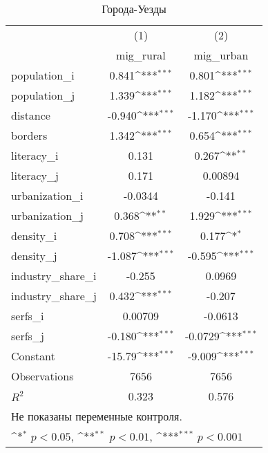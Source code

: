 \begin{table}[htbp]\centering
\def\sym#1{\ifmmode^{#1}\else\(^{#1}\)\fi}
\caption{Города-Уезды\label{table:r-u}}
\begin{tabular}{l*{2}{c}}
\hline\hline
                    &\multicolumn{1}{c}{(1)}&\multicolumn{1}{c}{(2)}\\
                    &\multicolumn{1}{c}{mig\_rural}&\multicolumn{1}{c}{mig\_urban}\\
\hline
population\_i        &       0.841\sym{***}&       0.801\sym{***}\\
population\_j        &       1.339\sym{***}&       1.182\sym{***}\\
distance            &      -0.940\sym{***}&      -1.170\sym{***}\\
borders             &       1.342\sym{***}&       0.654\sym{***}\\
literacy\_i          &       0.131         &       0.267\sym{**} \\
literacy\_j          &       0.171         &     0.00894         \\
urbanization\_i      &     -0.0344         &      -0.141         \\
urbanization\_j      &       0.368\sym{**} &       1.929\sym{***}\\
density\_i           &       0.708\sym{***}&       0.177\sym{*}  \\
density\_j           &      -1.087\sym{***}&      -0.595\sym{***}\\
industry\_share\_i    &      -0.255         &      0.0969         \\
industry\_share\_j    &       0.432\sym{***}&      -0.207         \\
serfs\_i             &     0.00709         &     -0.0613         \\
serfs\_j             &      -0.180\sym{***}&     -0.0729\sym{***}\\
Constant            &      -15.79\sym{***}&      -9.009\sym{***}\\
\hline
Observations        &        7656         &        7656         \\
\(R^{2}\)           &       0.323         &       0.576         \\
\hline\hline
\multicolumn{3}{l}{Не показаны переменные контроля.}\\
\multicolumn{3}{l}{\sym{*} \(p<0.05\), \sym{**} \(p<0.01\), \sym{***} \(p<0.001\)}\\
\end{tabular}
\end{table}
